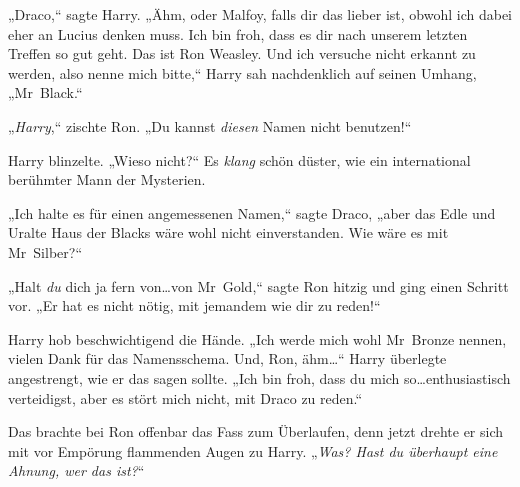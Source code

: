 „Draco,“ sagte Harry. „Ähm, oder Malfoy, falls dir das lieber ist, obwohl ich dabei eher an Lucius denken muss. Ich bin froh, dass es dir nach unserem letzten Treffen so gut geht. Das ist Ron Weasley. Und ich versuche nicht erkannt zu werden, also nenne mich bitte,“ Harry sah nachdenklich auf seinen Umhang, „Mr~Black.“

„\emph{Harry},“ zischte Ron. „Du kannst \emph{diesen} Namen nicht benutzen!“

Harry blinzelte. „Wieso nicht?“ Es \emph{klang} schön düster, wie ein international berühmter Mann der Mysterien.

„Ich halte es für einen angemessenen Namen,“ sagte Draco, „aber das Edle und Uralte Haus der Blacks wäre wohl nicht einverstanden. Wie wäre es mit Mr~Silber?“

„Halt \emph{du} dich ja fern von…von Mr~Gold,“ sagte Ron hitzig und ging einen Schritt vor. „Er hat es nicht nötig, mit jemandem wie dir zu reden!“

Harry hob beschwichtigend die Hände. „Ich werde mich wohl Mr~Bronze nennen, vielen Dank für das Namensschema. Und, Ron, ähm…“ Harry überlegte angestrengt, wie er das sagen sollte. „Ich bin froh, dass du mich so…enthusiastisch verteidigst, aber es stört mich nicht, mit Draco zu reden.“

Das brachte bei Ron offenbar das Fass zum Überlaufen, denn jetzt drehte er sich mit vor Empörung flammenden Augen zu Harry. „\emph{Was? Hast du überhaupt eine \emph{Ahnung}, wer das ist?}“


